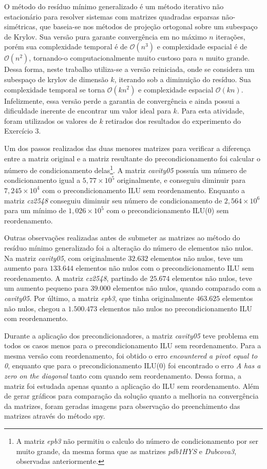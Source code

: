 \documentclass{article}
\begin{document}
O método do resíduo mínimo generalizado é um método iterativo não estacionário para resolver sistemas com matrizes quadradas esparsas não-simétricas, que baseia-se nos métodos de projeção ortogonal sobre um subespaço de Krylov. Sua versão pura garante convergência em no máximo $n$ iterações, porém sua complexidade temporal é de $\mathcal{O}(n^3)$ e complexidade espacial é de $\mathcal{O}(n^2)$, tornando-o computacionalmente muito custoso para $n$ muito grande. Dessa forma, neste trabalho utiliza-se a versão reiniciada, onde se considera um subespaço de krylov de dimensão $k$, iterando sob a diminuição do resíduo. Sua complexidade temporal se torna $\mathcal{O}(kn^2)$ e complexidade espacial $\mathcal{O}(kn)$. Infelizmente, essa versão perde a garantia de convergência e ainda possui a dificuldade inerente de encontrar um valor ideal para $k$. Para esta atividade, foram utilizados os valores de $k$ retirados dos resultados do experimento do Exercício 3.

Um dos passos realizados das duas menores matrizes para verificar a diferença entre a matriz original e a matriz resultante do precondicionamento foi calcular o número de condicionamento delas\footnote{A matriz \textit{epb3} não permitiu o calculo do número de condicionamento por ser muito grande, da mesma forma que as matrizes \textit{pdb1HYS} e \textit{Dubcova3}, observadas anteriormente.}. A matriz \textit{cavity05} possuía um número de condicionamento igual a $5,77\times 10^5$ originalmente, e conseguiu diminuir para $7,245\times10^4$ com o precondicionamento ILU sem reordenamento. Enquanto a matriz \textit{cz2548} conseguiu diminuir seu número de condicionamento de $2,564\times10^6$ para um mínimo de $1,026\times10^5$ com o precondicionamento ILU(0) sem reordenamento.

Outras observações realizadas antes de submeter as matrizes ao método do resíduo mínimo generalizado foi a alteração do número de elementos não nulos. Na matriz \textit{cavity05}, com originalmente $32.632$ elementos não nulos, teve um aumento para $133.644$ elementos não nulos com o precondicionamento ILU sem reordenamento. A matriz \textit{cz2548}, partindo de $25.674$ elementos não nulos, teve um aumento pequeno para $39.000$ elementos não nulos, quando comparado com a \textit{cavity05}. Por último, a matriz \textit{epb3}, que tinha originalmente $463.625$ elementos não nulos, chegou a $1.500.473$ elementos não nulos no precondicionamento ILU com reordenamento.

Durante a aplicação dos precondicionadores, a matriz \textit{cavity05} teve problema em todos os casos menos para o precondicionamento ILU sem reordenamento. Para a mesma versão com reordenamento, foi obtido o erro \textit{encountered a pivot equal to 0}, enquanto que para o precondicionamento ILU(0) foi encontrado o erro \textit{A has a zero on the diagonal} tanto com quando sem reordenamento. Dessa forma, a matriz foi estudada apenas quanto a aplicação do ILU sem reordenamento. Além de gerar gráficos para comparação da solução quanto a melhoria na convergência da matrizes, foram geradas imagens para observação do preenchimento das matrizes através do método spy.
\end{document}
